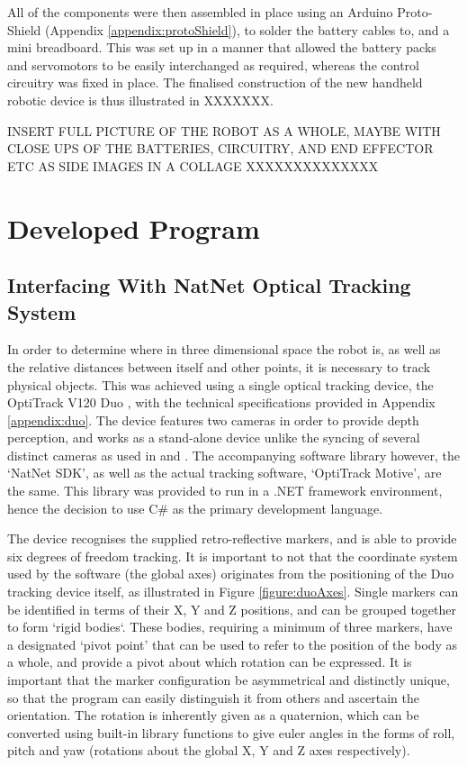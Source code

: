 \documentclass[11pt]{article}
\begin{document}
All of the components were then assembled in place using an Arduino Proto-Shield (Appendix \ref{appendix:protoShield}), to solder the battery cables to, and a mini breadboard. This was set up in a manner that allowed the battery packs and servomotors to be easily interchanged as required, whereas the control circuitry was fixed in place. The finalised construction of the new handheld robotic device is thus illustrated in XXXXXXX.

INSERT FULL PICTURE OF THE ROBOT AS A WHOLE, MAYBE WITH CLOSE UPS OF THE BATTERIES, CIRCUITRY, AND END EFFECTOR ETC AS SIDE IMAGES IN A COLLAGE XXXXXXXXXXXXXX

\pagebreak
\section{Developed Program}

\subsection{Interfacing With NatNet Optical Tracking System}
\label{section:natnet}
In order to determine where in three dimensional space the robot is, as well as the relative distances between itself and other points, it is necessary to track physical objects. This was achieved using a single optical tracking device, the OptiTrack V120 Duo \cite{OptiTrackSite}, with the technical specifications provided in Appendix \ref{appendix:duo}. The device features two cameras in order to provide depth perception, and works as a stand-alone device unlike the syncing of several distinct cameras as used in \cite{GreggSmithDesign} and \cite{GreggSmithFeedback}. The accompanying software library however, the `NatNet SDK', as well as the actual tracking software, `OptiTrack Motive', are the same. This library was provided to run in a .NET framework environment, hence the decision to use C\# as the primary development language.

The device recognises the supplied retro-reflective markers, and is able to provide six degrees of freedom tracking. It is important to not that the coordinate system used by the software (the global axes) originates from the positioning of the Duo tracking device itself, as illustrated in Figure \ref{figure:duoAxes}. Single markers can be identified in terms of their X, Y and Z positions, and can be grouped together to form `rigid bodies`. These bodies, requiring a minimum of three markers, have a designated `pivot point' that can be used to refer to the position of the body as a whole, and provide a pivot about which rotation can be expressed. It is important that the marker configuration be asymmetrical and distinctly unique, so that the program can easily distinguish it from others and ascertain the orientation. The rotation is inherently given as a quaternion, which can be converted using built-in library functions to give euler angles in the forms of roll, pitch and yaw (rotations about the global X, Y and Z axes respectively).
\end{document}

